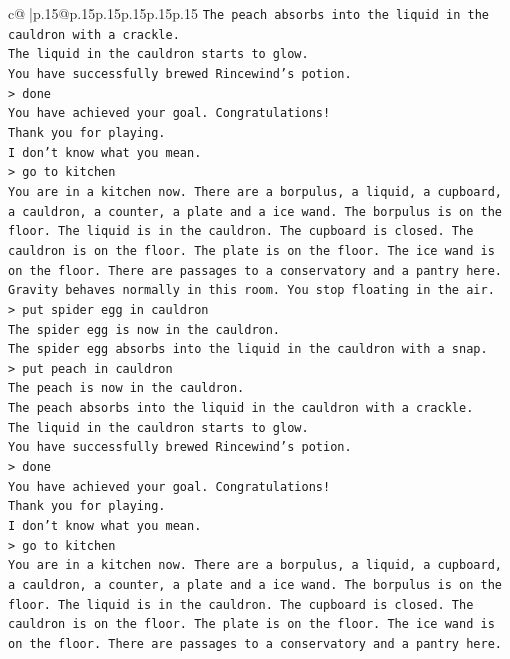 \documentclass{article}
\begin{document}
{\begin{supertabular}{c@{$\;$}|p{.15\linewidth}@{}p{.15\linewidth}p{.15\linewidth}p{.15\linewidth}p{.15\linewidth}p{.15\linewidth}}
{{{\texttt{The peach absorbs into the liquid in the cauldron with a crackle.} \\
\texttt{The liquid in the cauldron starts to glow.} \\
\texttt{You have successfully brewed Rincewind's potion.} \\
\texttt{> done} \\
\texttt{You have achieved your goal. Congratulations!} \\
\texttt{Thank you for playing.} \\
\texttt{I don't know what you mean.} \\
\texttt{> go to kitchen} \\
\texttt{You are in a kitchen now. There are a borpulus, a liquid, a cupboard, a cauldron, a counter, a plate and a ice wand. The borpulus is on the floor. The liquid is in the cauldron. The cupboard is closed. The cauldron is on the floor. The plate is on the floor. The ice wand is on the floor. There are passages to a conservatory and a pantry here.} \\
\texttt{Gravity behaves normally in this room. You stop floating in the air.} \\
\texttt{> put spider egg in cauldron} \\
\texttt{The spider egg is now in the cauldron.} \\
\texttt{The spider egg absorbs into the liquid in the cauldron with a snap.} \\
\texttt{> put peach in cauldron} \\
\texttt{The peach is now in the cauldron.} \\
\texttt{The peach absorbs into the liquid in the cauldron with a crackle.} \\
\texttt{The liquid in the cauldron starts to glow.} \\
\texttt{You have successfully brewed Rincewind's potion.} \\
\texttt{> done} \\
\texttt{You have achieved your goal. Congratulations!} \\
\texttt{Thank you for playing.} \\
\texttt{I don't know what you mean.} \\
\texttt{> go to kitchen} \\
\texttt{You are in a kitchen now. There are a borpulus, a liquid, a cupboard, a cauldron, a counter, a plate and a ice wand. The borpulus is on the floor. The liquid is in the cauldron. The cupboard is closed. The cauldron is on the floor. The plate is on the floor. The ice wand is on the floor. There are passages to a conservatory and a pantry here.} \\
}}}
\end{supertabular}}
\end{document}

